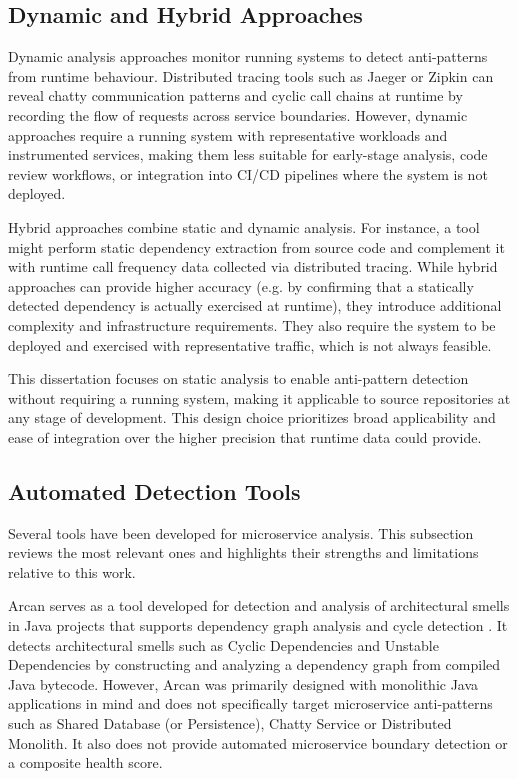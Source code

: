 \subsection{Dynamic and Hybrid Approaches}
\label{subsec:related-dynamic}

\par Dynamic analysis approaches monitor running systems to detect anti-patterns from runtime behaviour. Distributed tracing tools such as Jaeger or Zipkin can reveal chatty communication patterns and cyclic call chains at runtime by recording the flow of requests across service boundaries. However, dynamic approaches require a running system with representative workloads and instrumented services, making them less suitable for early-stage analysis, code review workflows, or integration into CI/CD pipelines where the system is not deployed.

Hybrid approaches combine static and dynamic analysis. For instance, a tool might perform static dependency extraction from source code and complement it with runtime call frequency data collected via distributed tracing. While hybrid approaches can provide higher accuracy (e.g. by confirming that a statically detected dependency is actually exercised at runtime), they introduce additional complexity and infrastructure requirements. They also require the system to be deployed and exercised with representative traffic, which is not always feasible.

This dissertation focuses on static analysis to enable anti-pattern detection without requiring a running system, making it applicable to source repositories at any stage of development. This design choice prioritizes broad applicability and ease of integration over the higher precision that runtime data could provide.

\subsection{Automated Detection Tools}
\label{subsec:related-tools}

\par Several tools have been developed for microservice analysis. This subsection reviews the most relevant ones and highlights their strengths and limitations relative to this work.

\par Arcan serves as a tool developed for detection and analysis of architectural smells in Java projects that supports dependency graph analysis and cycle detection \cite{Arcelli2017}. It detects architectural smells such as Cyclic Dependencies and Unstable Dependencies by constructing and analyzing a dependency graph from compiled Java bytecode. However, Arcan was primarily designed with monolithic Java applications in mind and does not specifically target microservice anti-patterns such as Shared Database (or Persistence), Chatty Service or Distributed Monolith. It also does not provide automated microservice boundary detection or a composite health score.

